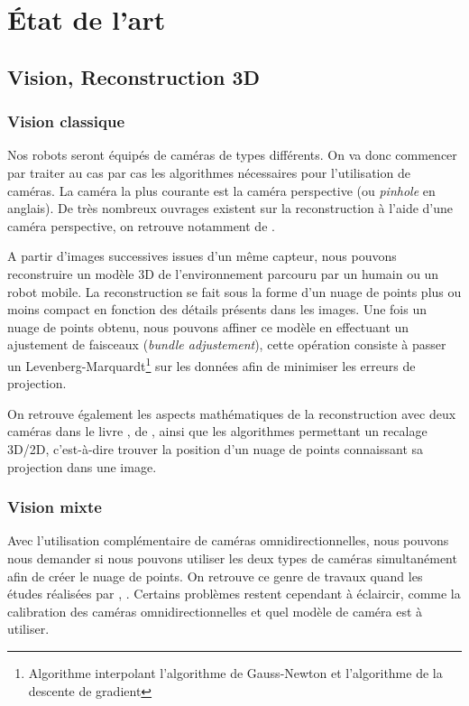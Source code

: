 \section{État de l'art}
\label{sec:etatart}

\subsection{Vision, Reconstruction 3D}

\subsubsection{Vision classique}

Nos robots seront équipés de caméras de types différents.
On va donc commencer par traiter au cas par cas les algorithmes nécessaires pour l'utilisation de caméras.
La caméra la plus courante est la caméra perspective (ou \textit{pinhole} en anglais).
De très nombreux ouvrages existent sur la reconstruction à l'aide d'une caméra perspective, on retrouve notamment   de \citeauthor{Hartley03Book} \cite{Hartley03Book}.

A partir d'images successives issues d'un même capteur, nous pouvons reconstruire un modèle 3D de l'environnement parcouru par un humain ou un robot mobile.
La reconstruction se fait sous la forme d'un nuage de points plus ou moins compact en fonction des détails présents dans les images.
Une fois un nuage de points obtenu, nous pouvons affiner ce modèle en effectuant un ajustement de faisceaux (\textit{bundle adjustement}), cette opération consiste à passer un Levenberg-Marquardt\footnote{Algorithme interpolant l'algorithme de Gauss-Newton et l'algorithme de la descente de gradient} sur les données afin de minimiser les erreurs de projection.

On retrouve également les aspects mathématiques de la reconstruction avec deux caméras dans le livre \cite{HoraudBook},  de \citeauthor{HoraudBook}, ainsi que les algorithmes permettant un recalage 3D/2D, c’est-à-dire trouver la position d'un nuage de points connaissant sa projection dans une image.

\subsubsection{Vision mixte}

Avec l'utilisation complémentaire de caméras omnidirectionnelles, nous pouvons nous demander si nous pouvons utiliser les deux types de caméras simultanément afin de créer le nuage de points.
On retrouve ce genre de travaux quand les études réalisées par
\citeauthor{Sturm02},  \cite{Sturm02}.
Certains problèmes restent cependant à éclaircir, comme la calibration des caméras omnidirectionnelles et quel modèle de caméra est à utiliser.

